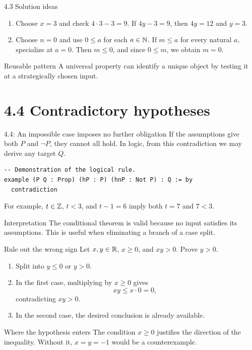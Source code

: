\begin{frame}{4.3 Solution ideas}
\begin{enumerate}
\item Choose $x=3$ and check $4\cdot3-3=9$. If $4y-3=9$, then $4y=12$ and $y=3$.
\item Choose $n=0$ and use $0\le a$ for each $a\in\mathbb{N}$. If $m\le a$ for every natural $a$, specialize at $a=0$. Then $m\le0$, and since $0\le m$, we obtain $m=0$.
\end{enumerate}
\begin{block}{Reusable pattern}
A universal property can identify a unique object by testing it at a strategically chosen input.
\end{block}
\end{frame}

\section{4.4 Contradictory hypotheses}
\begin{frame}[fragile]{4.4: An impossible case imposes no further obligation}
If the assumptions give both $P$ and $\neg P$, they cannot all hold.
In logic, from this contradiction we may derive any target $Q$.
\begin{lstlisting}
-- Demonstration of the logical rule.
example (P Q : Prop) (hP : P) (hnP : Not P) : Q := by
  contradiction
\end{lstlisting}
For example, $t\in\mathbb{Z}$, $t<3$, and $t-1=6$ imply both $t=7$ and $7<3$.
\begin{block}{Interpretation}
The conditional theorem is valid because no input satisfies its assumptions. This is useful when eliminating a branch of a case split.
\end{block}
\end{frame}

\begin{frame}{Rule out the wrong sign}
Let $x,y\in\mathbb{R}$, $x\ge0$, and $xy>0$. Prove $y>0$.
\begin{enumerate}
\item Split into $y\le0$ or $y>0$.
\item In the first case, multiplying by $x\ge0$ gives
\[
xy\le x\cdot0=0,
\]
contradicting $xy>0$.
\item In the second case, the desired conclusion is already available.
\end{enumerate}
\begin{block}{Where the hypothesis enters}
The condition $x\ge0$ justifies the direction of the inequality. Without it, $x=y=-1$ would be a counterexample.
\end{block}
\end{frame}

